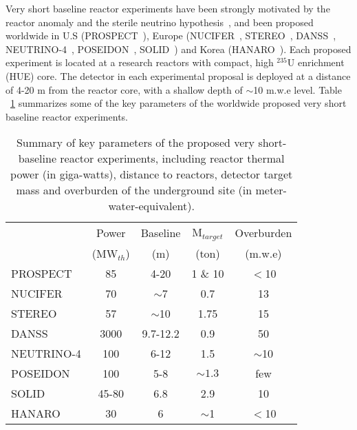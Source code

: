 Very short baseline reactor experiments have been strongly motivated by the reactor anomaly and the sterile neutrino hypothesis~\cite{sterileWP}, and been proposed worldwide in U.S (PROSPECT~\cite{PROSPECT}), Europe (NUCIFER~\cite{NUCIFER-2010, NUCIFER-2014}, STEREO~\cite{NUCIFER-2014}, DANSS~\cite{DANSS}, NEUTRINO-4~\cite{NEUTRINO4-2012,NEUTRINO4-2014}, POSEIDON~\cite{POSEIDON}, SOLID~\cite{SoLid}) and Korea (HANARO~\cite{HANARO}). Each proposed experiment is located at a research reactors with compact, high $^{235}$U enrichment (HUE) core. The detector in each experimental proposal is deployed at a distance of 4-20 m from the reactor core, with a shallow depth of $\sim$10 m.w.e level. Table ~\ref{tab:sterile} summarizes some of the key parameters of the worldwide proposed very short baseline reactor experiments.

\begin{table}[t]
  \begin{tabular}{lcccc}
  \hline
  & Power & Baseline & M$_{target}$ & Overburden \\
  & (MW$_{th}$) & (m) & (ton) & (m.w.e)    \\
  \hline
  PROSPECT  & 85  & 4-20 & 1 \& 10     & $<$10 \\
  NUCIFER   & 70 & $\sim$7  & 0.7 & 13\\
  STEREO & 57  & $\sim$10 & 1.75  & 15\\
  DANSS & 3000  & 9.7-12.2  & 0.9  & 50\\
  NEUTRINO-4 & 100  & 6-12  & 1.5  & $\sim$10 \\
  POSEIDON & 100  & 5-8  & $\sim1.3$ & few\\
  SOLID & 45-80 & 6.8  & 2.9  & 10\\
  HANARO & 30  & 6  & $\sim$1  & $<$10\\
  \hline
  \end{tabular}
  \caption{Summary of key parameters of the proposed very short-baseline reactor experiments, including reactor thermal power (in giga-watts), distance to reactors, detector target mass and overburden of the underground site (in meter-water-equivalent).}
\label{tab:sterile}
\end{table}

